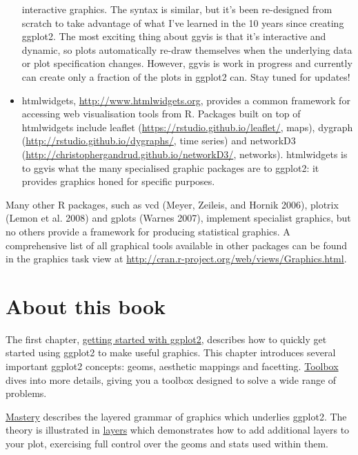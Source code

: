 \begin{itemize}
  interactive graphics. The syntax is similar, but it's been re-designed
  from scratch to take advantage of what I've learned in the 10 years
  since creating ggplot2. The most exciting thing about ggvis is that
  it's interactive and dynamic, so plots automatically re-draw
  themselves when the underlying data or plot specification changes.
  However, ggvis is work in progress and currently can create only a
  fraction of the plots in ggplot2 can. Stay tuned for updates!
\item
  htmlwidgets, \url{http://www.htmlwidgets.org}, provides a common
  framework for accessing web visualisation tools from R. Packages built
  on top of htmlwidgets include leaflet
  (\url{https://rstudio.github.io/leaflet/}, maps), dygraph
  (\url{http://rstudio.github.io/dygraphs/}, time series) and networkD3
  (\url{http://christophergandrud.github.io/networkD3/}, networks).
  htmlwidgets is to ggvis what the many specialised graphic packages are
  to ggplot2: it provides graphics honed for specific purposes.
\end{itemize}

Many other R packages, such as vcd (Meyer, Zeileis, and Hornik 2006),
plotrix (Lemon et al. 2008) and gplots (Warnes 2007), implement
specialist graphics, but no others provide a framework for producing
statistical graphics. A comprehensive list of all graphical tools
available in other packages can be found in the graphics task view at
\url{http://cran.r-project.org/web/views/Graphics.html}.

\section{About this book}\label{about-this-book}

The first chapter, \protect\hyperlink{cha:getting-started}{getting
started with ggplot2}, describes how to quickly get started using
ggplot2 to make useful graphics. This chapter introduces several
important ggplot2 concepts: geoms, aesthetic mappings and facetting.
\protect\hyperlink{cha:toolbox}{Toolbox} dives into more details, giving
you a toolbox designed to solve a wide range of problems.

\protect\hyperlink{cha:mastery}{Mastery} describes the layered grammar
of graphics which underlies ggplot2. The theory is illustrated in
\protect\hyperlink{cha:layers}{layers} which demonstrates how to add
additional layers to your plot, exercising full control over the geoms
and stats used within them.

